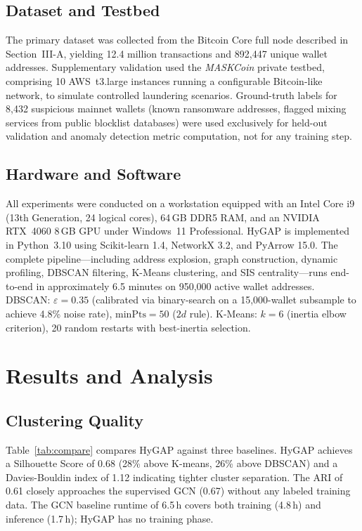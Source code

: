 \documentclass[conference]{IEEEtran}
\begin{document}
\subsection{Dataset and Testbed}
The primary dataset was collected from the Bitcoin Core full node
described in Section~III-A, yielding 12.4 million transactions
and 892{,}447 unique wallet addresses. Supplementary validation
used the \emph{MASKCoin} private testbed, comprising 10
AWS~t3.large instances running a configurable Bitcoin-like
network, to simulate controlled laundering scenarios.
Ground-truth labels for 8{,}432 suspicious mainnet wallets (known
ransomware addresses, flagged mixing services from public
blocklist databases) were used exclusively for held-out
validation and anomaly detection metric computation, not for
any training step.

\subsection{Hardware and Software}
All experiments were conducted on a workstation equipped with an
Intel Core i9 (13th Generation, 24 logical cores), 64\,GB DDR5
RAM, and an NVIDIA RTX~4060 8\,GB GPU under Windows~11
Professional. HyGAP is implemented in Python~3.10 using
Scikit-learn 1.4, NetworkX 3.2, and PyArrow 15.0. The complete
pipeline---including address explosion, graph construction,
dynamic profiling, DBSCAN filtering, K-Means clustering,
and SIS centrality---runs end-to-end in approximately 6.5
minutes on 950{,}000 active wallet addresses.
DBSCAN: $\varepsilon\!=\!0.35$ (calibrated via binary-search
on a 15{,}000-wallet subsample to achieve 4.8\% noise rate),
$\mathrm{minPts}\!=\!50$ ($2d$ rule).
K-Means: $k\!=\!6$ (inertia elbow criterion), 20 random
restarts with best-inertia selection.

\section{Results and Analysis}

\subsection{Clustering Quality}
Table~\ref{tab:compare} compares HyGAP against three baselines.
HyGAP achieves a Silhouette Score of 0.68 (28\% above K-means,
26\% above DBSCAN) and a Davies-Bouldin index of 1.12 indicating
tighter cluster separation. The ARI of 0.61 closely approaches
the supervised GCN (0.67) without any labeled training data.
The GCN baseline runtime of 6.5\,h covers both training
(4.8\,h) and inference (1.7\,h); HyGAP has no training phase.
\end{document}
